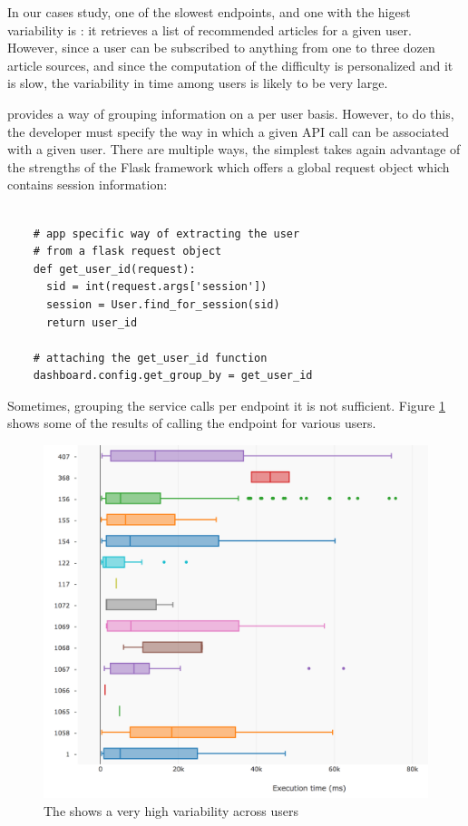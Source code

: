\documentclass[conference]{IEEEtran}
\begin{document}
  In our cases study, one of the slowest endpoints, and one with the higest variability is \epFeedItems: it retrieves a list of recommended articles for a given user. However, since a user can be subscribed to anything from one to three dozen article sources, and since the computation of the difficulty is personalized and it is slow, the variability in time among users is likely to be very large. 

  \tool provides a way of grouping information on a per user basis. However, to do this, the developer must specify the way in which a given API call can be associated with a given user. There are multiple ways, the simplest takes again advantage of the strengths of the Flask framework which offers a global request object which contains session information: 

  \begin{lstlisting}[float,caption=TBA,style=custompython]
    
    # app specific way of extracting the user
    # from a flask request object    
    def get_user_id(request):
      sid = int(request.args['session'])
      session = User.find_for_session(sid)
      return user_id

    # attaching the get_user_id function
    dashboard.config.get_group_by = get_user_id

  \end{lstlisting}


  Sometimes, grouping the service calls per endpoint it is not sufficient. Figure \ref{fig:tpu} shows some of the results of calling the \epFeedItems endpoint for various users. 

  \begin{figure}[h!]
    \centering
    \includegraphics[width=\linewidth]{time_per_user}
    \caption{The \epFeedItems shows a very high variability across users}
    \label{fig:tpu}
  \end{figure}
\end{document}

